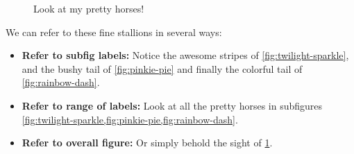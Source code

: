 \documentclass[]{article}
\providecommand{\tightlist}{%
  \setlength{\itemsep}{0pt}\setlength{\parskip}{0pt}}
\begin{document}
\begin{figure}
\centering

\hfill {}
\hfill {}

\caption{Look at my pretty horses!}

\label{fig:horses}

\end{figure}

We can refer to these fine stallions in several ways:

\begin{itemize}
\tightlist
\item
  \textbf{Refer to subfig labels:} Notice the awesome stripes of
  \cref{fig:twilight-sparkle}, and the bushy tail of
  \cref{fig:pinkie-pie} and finally the colorful tail of
  \cref{fig:rainbow-dash}.
\item
  \textbf{Refer to range of labels:} Look at all the pretty horses in
  subfigures
  \cref{fig:twilight-sparkle,fig:pinkie-pie,fig:rainbow-dash}.
\item
  \textbf{Refer to overall figure:} Or simply behold the sight of
  \cref{fig:horses}.
\end{itemize}
\end{document}
